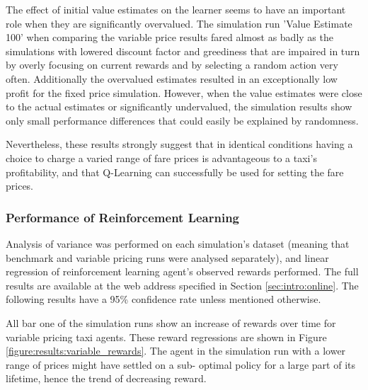 The effect of initial value estimates on the learner seems to have an important
role when they are significantly overvalued. The simulation run 'Value Estimate
100' when comparing the variable price results fared almost as badly as the
simulations with lowered discount factor and greediness that are impaired in
turn by overly focusing on current rewards and by selecting a random action
very often. Additionally the overvalued estimates resulted in an exceptionally
low profit for the fixed price simulation. However, when the value estimates
were close to the actual estimates or significantly undervalued, the simulation
results show only small performance differences that could easily be explained
by randomness.

Nevertheless, these results strongly suggest that in identical conditions
having a choice to charge a varied range of fare prices is advantageous to a
taxi's profitability, and that Q-Learning can successfully be used for setting
the fare prices.


\subsubsection{Performance of Reinforcement Learning}
\label{sec:results:ai}

Analysis of variance was performed on each simulation's dataset (meaning that
benchmark and variable pricing runs were analysed separately), and linear
regression of reinforcement learning agent's observed rewards performed. The
full results are available at the web address specified in Section
\ref{sec:intro:online}. The following results have a 95\% confidence rate
unless mentioned otherwise.

All bar one of the simulation runs show an increase of rewards over time for
variable pricing taxi agents. These reward regressions are shown in Figure
\ref{figure:results:variable_rewards}. The agent in the simulation run with a
lower range of prices might have settled on a sub- optimal policy for a large
part of its lifetime, hence the trend of decreasing reward.

